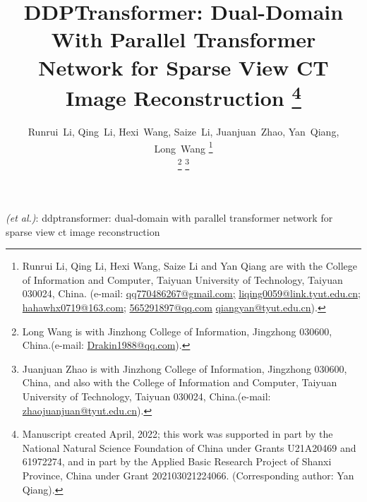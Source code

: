 \documentclass[lettersize,journal]{IEEEtran}
\begin{document}
\title{DDPTransformer: Dual-Domain With Parallel Transformer Network for Sparse View CT Image Reconstruction
	\thanks{Manuscript created April, 2022; this work was supported in part by the National Natural Science Foundation of China under Grants U21A20469 and 61972274, and in part by the Applied Basic Research Project of Shanxi Province, China under Grant 202103021224066. (Corresponding author: Yan Qiang).}
}
\author{Runrui~Li, Qing~Li, Hexi~Wang, Saize~Li, Juanjuan~Zhao, Yan~Qiang, Long~Wang
	\thanks{Runrui Li, Qing Li, Hexi Wang, Saize Li and Yan Qiang are with the College of Information and Computer, Taiyuan University of Technology, Taiyuan 030024, China. (e-mail: \href{mailto:qq770486267@gmail.com}{qq770486267@gmail.com;} \href{mailto:liqing0059@link.tyut.edu.cn}{liqing0059@link.tyut.edu.cn;} \href{mailto:hahawhx0719@163.com}{hahawhx0719@163.com;} \href{mailto:565291897@qq.com}{565291897@qq.com} \href{mailto:qiangyan@tyut.edu.cn}{qiangyan@tyut.edu.cn}).}
		
	\thanks{Long Wang is with Jinzhong College of Information, Jingzhong 030600, China.(e-mail: \href{mailto:Drakin1988@qq.com}{Drakin1988@qq.com}).}
	\thanks{Juanjuan Zhao is with Jinzhong College of Information, Jingzhong 030600, China, and also with the College of Information and Computer, Taiyuan University of Technology, Taiyuan 030024, China.(e-mail: \href{mailto:zhaojuanjuan@tyut.edu.cn}{zhaojuanjuan@tyut.edu.cn}).}
}
{\MakeLowercase{\textit{(et al.)}:
DDPTransformer: Dual-Domain With Parallel Transformer Network for Sparse View CT Image Reconstruction}}

\end{document}
